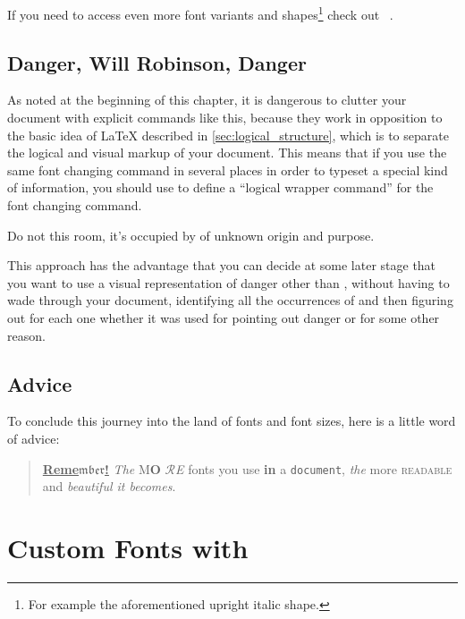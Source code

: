 If you need to access even more font variants and shapes\footnote{For example
  the aforementioned \selectfont upright italic shape.} check out
~\cite{fntguide}.

\subsection{Danger, Will Robinson, Danger}

As noted at the beginning of this chapter, it is dangerous to clutter your
document with explicit commands like this, because they work in opposition to
the basic idea of \LaTeX{} described in \autoref{sec:logical_structure}, which
is to separate the logical and visual markup of your document. This means that
if you use the same font changing command in several places in order to typeset
a special kind of information, you should use  to
define a \enquote{logical wrapper command} for the font changing command.

\begin{example}
Do not  this room,
it's occupied by 
of unknown origin and purpose.
\end{example}

This approach has the advantage that you can decide at some later
stage that you want to use a visual representation of danger other
than , without having to wade through your document,
identifying all the occurrences of  and then figuring out
for each one whether it was used for pointing out danger or for some other
reason.

\subsection{Advice}

To conclude this journey into the land of fonts and font sizes,
here is a little word of advice:\nopagebreak

\begin{quote}
  \underline{\textbf{Reme\(\mathfrak{mber}\)\Huge!}} \textit{The}
  \textsf{M\textbf{\LARGE O} \(\mathcal{R}\)\textsl{E}} fonts \Huge you
  \tiny use \footnotesize \textbf{in} a \small \texttt{document},
  \large \textit{the} \normalsize more \textsc{readable} and
  \textsl{\textsf{beautiful} it bec\large o\Large m\LARGE e\huge s}.
\end{quote}

\section{Custom Fonts with }\label{sec:fontspec}

